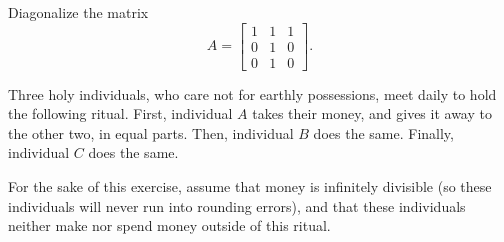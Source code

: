\documentclass[addpoints]{exam}
\begin{document}
\begin{questions}

\question[20] Diagonalize the matrix
\[A =
\begin{bmatrix}
1 & 1 & 1 \\
0 & 1 & 0 \\
0 & 1 & 0
\end{bmatrix}.\]

\question[20] Three holy individuals, who care not for earthly possessions, meet daily to hold the following ritual. First, individual $A$ takes their money, and gives it away to the other two, in equal parts. Then, individual $B$ does the same. Finally, individual $C$ does the same.

For the sake of this exercise, assume that money is infinitely divisible (so these individuals will never run into rounding errors), and that these individuals neither make nor spend money outside of this ritual.

\end{questions}
\end{document}
